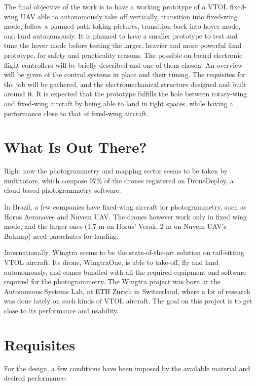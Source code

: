 %
The final objective of the work is to have a working prototype of a VTOL fixed-wing UAV able to autonomously take off vertically, transition into fixed-wing mode, follow a planned path taking pictures, transition back into hover mode, and land autonomously.
%
It is planned to have a smaller prototype to test and tune the hover mode before testing the larger, heavier and more powerful final prototype, for safety and practicality reasons.
%
The possible on-board electronic flight controllers will be briefly described and one of them chosen.
%
An overview will be given of the control systems in place and their tuning.
%
The requisites for the job will be gathered, and the electromechanical structure designed and built around it.
%
It is expected that the prototype fulfills the hole between rotary-wing and fixed-wing aircraft by being able to land in tight spaces, while having a performance close to that of fixed-wing aircraft.

\section{What Is Out There?}
Right now the photogrammetry and mapping sector seems to be taken by multirotors, which compose 97\% of the drones registered on DroneDeploy\cite{dronedeployreport}, a cloud-based photogrammetry software. 

In Brazil, a few companies have fixed-wing aircraft for photogrammetry, such as Horus Aeronaves and Nuvem UAV. The drones however work only in fixed wing mode, and the larger ones (1.7 m on Horus' Verok, 2 m on Nuvem UAV's Batmap) need parachutes for landing. 

Internationally, Wingtra seems to be the state-of-the-art solution on tail-sitting VTOL aircraft. Its drone, WingtraOne, is able to take-off, fly and land autonomously, and comes bundled with all the required equipment and software required for the photogrammetry. The Wingtra project was born at the  Autonomous Systems Lab, at ETH Zurich in Switzerland, where a lot of research was done lately on such kinds of VTOL aircraft\cite{autonomoussystemslab}. The goal on this project is to get close to its performance and usability.
\section{Requisites}

For the design, a few conditions have been imposed by the available material and desired performance:

